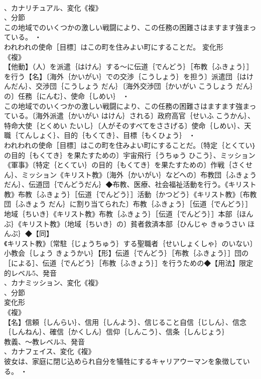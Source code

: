 \documentclass[8pt]{extreport}
\begin{document}
\begin{CJK}{UTF8}{min}
\\	、カナリチュアル、変化《複》
\\	、分節
\\	この地域でのいくつかの激しい戦闘により、この任務の困難さはますます強まっている。 ・
\\	われわれの使命［目標］はこの町を住みよい町にすることだ。	変化形 
\\	《複》
\\	【他動】（人）を派遣｛はけん｝する～に伝道｛でんどう｝［布教｛ふきょう｝］を行う【名】〔海外｛かいがい｝での交渉｛こうしょう｝を担う〕派遣団｛はけんだん｝、交渉団｛こうしょう だん｝〔海外交渉団｛かいがい こうしょう だん｝の〕任務｛にんむ｝、使命｛しめい｝ ・
\\	この地域でのいくつかの激しい戦闘により、この任務の困難さはますます強まっている。〔海外派遣｛かいがい はけん｝される〕政府高官｛せいふ こうかん｝、特命大使｛とくめい たいし｝〔人がそのすべてをささげる〕使命｛しめい｝、天職｛てんしょく｝、目的｛もくてき｝、目標｛もくひょう｝ ・
\\	われわれの使命［目標］はこの町を住みよい町にすることだ。〔特定｛とくてい｝の目的｛もくてき｝を果たすための〕宇宙飛行｛うちゅう ひこう｝、ミッション《軍事》〔特定｛とくてい｝の目的｛もくてき｝を果たすための〕作戦｛さくせん｝、ミッション《キリスト教》〔海外｛かいがい｝などへの〕布教団｛ふきょう だん｝、伝道団｛でんどうだん｝◆布教、医療、社会福祉活動を行う。《キリスト教》布教｛ふきょう｝［伝道｛でんどう｝］活動｛かつどう｝《キリスト教》〔布教団｛ふきょう だん｝に割り当てられた〕布教｛ふきょう｝［伝道｛でんどう｝］地域｛ちいき｝《キリスト教》布教｛ふきょう｝［伝道｛でんどう｝］本部｛ほんぶ｝《キリスト教》〔地域｛ちいき｝の〕貧者救済本部｛ひんじゃ きゅうさい ほんぶ｝◆【同】
\\	《キリスト教》〔常駐｛じょうちゅう｝する聖職者｛せいしょくしゃ｝のいない〕小教会｛しょう きょうかい｝【形】伝道｛でんどう｝［布教｛ふきょう｝］団の［による］、伝道｛でんどう｝［布教｛ふきょう｝］を行うための◆【用法】限定的レベル5、発音
\\	、カナミッション、変化《複》
\\	、分節
\\	変化形 
\\	《複》
\\	【名】信頼｛しんらい｝、信用｛しんよう｝、信じること自信｛じしん｝、信念｛しんねん｝、確信｛かくしん｝信仰｛しんこう｝、信条｛しんじょう｝
\\	教義、～教レベル3、発音
\\	、カナフェイス、変化《複》
\\	彼女は、家庭に閉じ込められ自分を犠牲にするキャリアウーマンを象徴している。 ・

\end{CJK}
\end{document}
